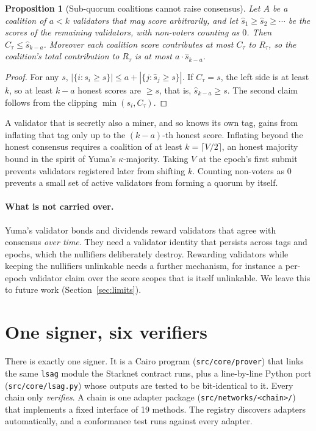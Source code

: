 \documentclass[11pt]{article}
\newtheorem{proposition}[theorem]{Proposition}
\theoremstyle{remark}
\newcommand{\tg}{\tau}
\begin{document}
\begin{proposition}[Sub-quorum coalitions cannot raise consensus]\label{prop:clip}
Let $A$ be a coalition of $a < k$ validators that may score arbitrarily, and let $\hat s_1\ge\hat s_2\ge\cdots$ be the scores of the remaining validators, with non-voters counting as $0$. Then $C_\tg \le \hat s_{k-a}$. Moreover each coalition score contributes at most $C_\tg$ to $R_\tg$, so the coalition's total contribution to $R_\tg$ is at most $a\cdot\hat s_{k-a}$.
\end{proposition}

\begin{proof}
For any $s$, $|\{i : s_i\ge s\}| \le a + |\{j : \hat s_j \ge s\}|$. If $C_\tg = s$, the left side is at least $k$, so at least $k-a$ honest scores are $\ge s$, that is, $\hat s_{k-a}\ge s$. The second claim follows from the clipping $\min(s_i,C_\tg)$.
\end{proof}

A validator that is secretly also a miner, and so knows its own tag, gains from inflating that tag only up to the $(k-a)$-th honest score. Inflating beyond the honest consensus requires a coalition of at least $k = \lceil V/2\rceil$, an honest majority bound in the spirit of Yuma's $\kappa$-majority. Taking $V$ at the epoch's first submit prevents validators registered later from shifting $k$. Counting non-voters as $0$ prevents a small set of active validators from forming a quorum by itself.

\paragraph{What is not carried over.} Yuma's validator bonds and dividends reward validators that agree with consensus \emph{over time}. They need a validator identity that persists across tags and epochs, which the nullifiers deliberately destroy. Rewarding validators while keeping the nullifiers unlinkable needs a further mechanism, for instance a per-epoch validator claim over the score scopes that is itself unlinkable. We leave this to future work (Section~\ref{sec:limits}).

\section{One signer, six verifiers}\label{sec:impl}

There is exactly one signer. It is a Cairo program (\texttt{src/core/prover}) that links the same \texttt{lsag} module the Starknet contract runs, plus a line-by-line Python port (\texttt{src/core/lsag.py}) whose outputs are tested to be bit-identical to it. Every chain only \emph{verifies}. A chain is one adapter package (\texttt{src/networks/<chain>/}) that implements a fixed interface of 19 methods. The registry discovers adapters automatically, and a conformance test runs against every adapter.
\end{document}
